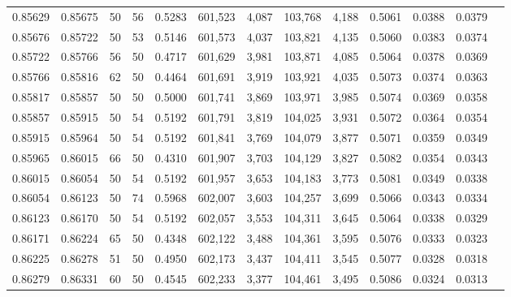 \begin{tabular}{rrrrrrrrrrrrr}
0.85629 & 0.85675 &    50 &  56 &                                     0.5283 & 601,523 &   4,087 & 103,768 &   4,188 & 0.5061 & 0.0388 & 0.0379 \\
0.85676 & 0.85722 &    50 &  53 &                                     0.5146 & 601,573 &   4,037 & 103,821 &   4,135 & 0.5060 & 0.0383 & 0.0374 \\
0.85722 & 0.85766 &    56 &  50 &                                     0.4717 & 601,629 &   3,981 & 103,871 &   4,085 & 0.5064 & 0.0378 & 0.0369 \\
0.85766 & 0.85816 &    62 &  50 &                                     0.4464 & 601,691 &   3,919 & 103,921 &   4,035 & 0.5073 & 0.0374 & 0.0363 \\
0.85817 & 0.85857 &    50 &  50 &                                     0.5000 & 601,741 &   3,869 & 103,971 &   3,985 & 0.5074 & 0.0369 & 0.0358 \\
0.85857 & 0.85915 &    50 &  54 &                                     0.5192 & 601,791 &   3,819 & 104,025 &   3,931 & 0.5072 & 0.0364 & 0.0354 \\
0.85915 & 0.85964 &    50 &  54 &                                     0.5192 & 601,841 &   3,769 & 104,079 &   3,877 & 0.5071 & 0.0359 & 0.0349 \\
0.85965 & 0.86015 &    66 &  50 &                                     0.4310 & 601,907 &   3,703 & 104,129 &   3,827 & 0.5082 & 0.0354 & 0.0343 \\
0.86015 & 0.86054 &    50 &  54 &                                     0.5192 & 601,957 &   3,653 & 104,183 &   3,773 & 0.5081 & 0.0349 & 0.0338 \\
0.86054 & 0.86123 &    50 &  74 &                                     0.5968 & 602,007 &   3,603 & 104,257 &   3,699 & 0.5066 & 0.0343 & 0.0334 \\
0.86123 & 0.86170 &    50 &  54 &                                     0.5192 & 602,057 &   3,553 & 104,311 &   3,645 & 0.5064 & 0.0338 & 0.0329 \\
0.86171 & 0.86224 &    65 &  50 &                                     0.4348 & 602,122 &   3,488 & 104,361 &   3,595 & 0.5076 & 0.0333 & 0.0323 \\
0.86225 & 0.86278 &    51 &  50 &                                     0.4950 & 602,173 &   3,437 & 104,411 &   3,545 & 0.5077 & 0.0328 & 0.0318 \\
0.86279 & 0.86331 &    60 &  50 &                                     0.4545 & 602,233 &   3,377 & 104,461 &   3,495 & 0.5086 & 0.0324 & 0.0313 \\

\end{tabular}
